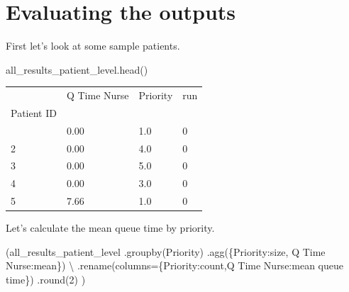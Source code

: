 \documentclass[
  letterpaper,
  DIV=11,
  numbers=noendperiod]{scrreprt}
\newenvironment{Shaded}{\begin{snugshade}}{\end{snugshade}}
\newcommand{\BuiltInTok}[1]{\textcolor[rgb]{0.00,0.23,0.31}{#1}}
\newcommand{\DecValTok}[1]{\textcolor[rgb]{0.68,0.00,0.00}{#1}}
\newcommand{\NormalTok}[1]{\textcolor[rgb]{0.00,0.23,0.31}{#1}}
\newcommand{\OperatorTok}[1]{\textcolor[rgb]{0.37,0.37,0.37}{#1}}
\newcommand{\StringTok}[1]{\textcolor[rgb]{0.13,0.47,0.30}{#1}}
\begin{document}
\section{Evaluating the outputs}\label{evaluating-the-outputs-2}

First let's look at some sample patients.

\begin{Shaded}
\begin{Highlighting}[]
\NormalTok{all\_results\_patient\_level.head()}
\end{Highlighting}
\end{Shaded}

\begin{longtable}[]{@{}llll@{}}
\toprule\noalign{}
& Q Time Nurse & Priority & run \\
Patient ID & & & \\
\midrule\noalign{}
\endhead
\bottomrule\noalign{}
\endlastfoot
1 & 0.00 & 1.0 & 0 \\
2 & 0.00 & 4.0 & 0 \\
3 & 0.00 & 5.0 & 0 \\
4 & 0.00 & 3.0 & 0 \\
5 & 7.66 & 1.0 & 0 \\
\end{longtable}

Let's calculate the mean queue time by priority.

\begin{Shaded}
\begin{Highlighting}[]
\NormalTok{(all\_results\_patient\_level}
\NormalTok{    .groupby(}\StringTok{\textquotesingle{}Priority\textquotesingle{}}\NormalTok{)}
\NormalTok{    .agg(\{}\StringTok{\textquotesingle{}Priority\textquotesingle{}}\NormalTok{:}\StringTok{\textquotesingle{}size\textquotesingle{}}\NormalTok{, }\StringTok{\textquotesingle{}Q Time Nurse\textquotesingle{}}\NormalTok{:}\StringTok{\textquotesingle{}mean\textquotesingle{}}\NormalTok{\}) }\OperatorTok{\textbackslash{}}
\NormalTok{    .rename(columns}\OperatorTok{=}\NormalTok{\{}\StringTok{\textquotesingle{}Priority\textquotesingle{}}\NormalTok{:}\StringTok{\textquotesingle{}count\textquotesingle{}}\NormalTok{,}\StringTok{\textquotesingle{}Q Time Nurse\textquotesingle{}}\NormalTok{:}\StringTok{\textquotesingle{}mean queue time\textquotesingle{}}\NormalTok{\})}
\NormalTok{    .}\BuiltInTok{round}\NormalTok{(}\DecValTok{2}\NormalTok{)}
\NormalTok{    )}
\end{Highlighting}
\end{Shaded}
\end{document}
